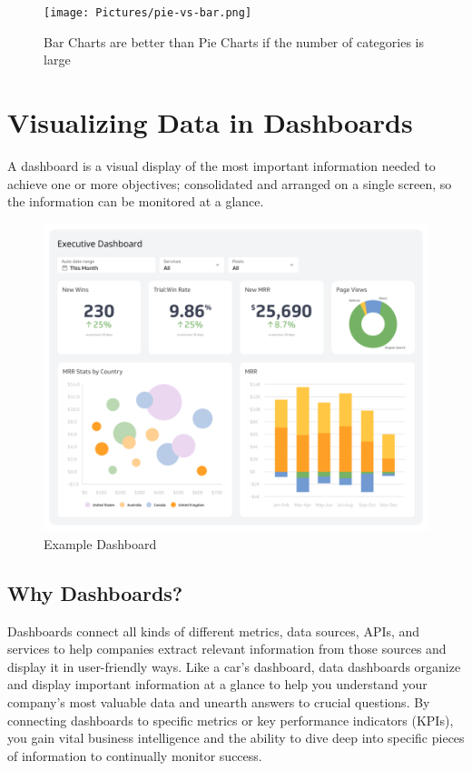\documentclass[11pt,fleqn]{book} %
\begin{document}
\begin{example}
\begin{figure}[hibt!]
  \centering
  \texttt{[image: Pictures/pie-vs-bar.png]}
  \caption{Bar Charts are better than Pie Charts if
  the number of categories is large}
  \label{fig:pie-vs-bar}
\end{figure}

\section{Visualizing Data in Dashboards}

\begin{definition}[Dashboard]
  A dashboard is a visual display of the most important information
  needed to achieve one or more objectives;
  consolidated and arranged on a single screen, so the information
  can be monitored at a glance.
\end{definition}

\begin{figure}[htb!]
  \centering
  \includegraphics[width=0.7\linewidth]{Pictures/dashboard.png}
  \caption{Example Dashboard}
  \label{fig:dashboard}
\end{figure}


\subsection{Why Dashboards?}

Dashboards connect all kinds of different metrics, data sources, APIs, and
services to help companies extract relevant information from those sources and
display it in user-friendly ways.
Like a car’s dashboard, data dashboards organize and display important
information at a glance to help you understand your company’s most valuable
data and unearth answers to crucial questions.
By connecting dashboards to specific metrics or key performance indicators
(KPIs), you gain vital business intelligence and the ability to dive deep into
specific pieces of information to continually monitor success.


\end{example}
\end{document}
